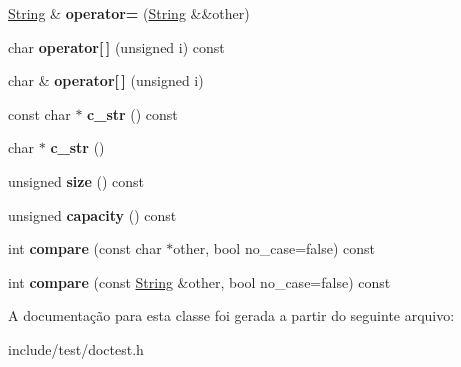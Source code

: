 \begin{DoxyCompactItemize}
\item 
\mbox{\label{classdoctest_1_1String_a6099dbedeb150eb5659c7aa5dcea1727}} 
\hyperlink{classdoctest_1_1String}{String} \& {\bfseries operator=} (\hyperlink{classdoctest_1_1String}{String} \&\&other)
\item 
\mbox{\label{classdoctest_1_1String_adf69290bc23e8c7bf60a9bcf765ebc10}} 
char {\bfseries operator\mbox{[}$\,$\mbox{]}} (unsigned i) const
\item 
\mbox{\label{classdoctest_1_1String_acd37c72485c1277fc673f6b328138b40}} 
char \& {\bfseries operator\mbox{[}$\,$\mbox{]}} (unsigned i)
\item 
\mbox{\label{classdoctest_1_1String_a607c6977b193fecf29622110e6081625}} 
const char $\ast$ {\bfseries c\+\_\+str} () const
\item 
\mbox{\label{classdoctest_1_1String_a35df67f11652bcc568ad3af470c344c0}} 
char $\ast$ {\bfseries c\+\_\+str} ()
\item 
\mbox{\label{classdoctest_1_1String_a9fbc7b09f1660b236f12fc2adce6183d}} 
unsigned {\bfseries size} () const
\item 
\mbox{\label{classdoctest_1_1String_adad8703f08950d173d2cb1426391fcdf}} 
unsigned {\bfseries capacity} () const
\item 
\mbox{\label{classdoctest_1_1String_aef87d1f106d32d8c31af87335b44164d}} 
int {\bfseries compare} (const char $\ast$other, bool no\+\_\+case=false) const
\item 
\mbox{\label{classdoctest_1_1String_adb57becb56e054d981e7c2b967a7e359}} 
int {\bfseries compare} (const \hyperlink{classdoctest_1_1String}{String} \&other, bool no\+\_\+case=false) const
\end{DoxyCompactItemize}


A documentação para esta classe foi gerada a partir do seguinte arquivo\+:\begin{DoxyCompactItemize}
\item 
include/test/doctest.\+h\end{DoxyCompactItemize}
